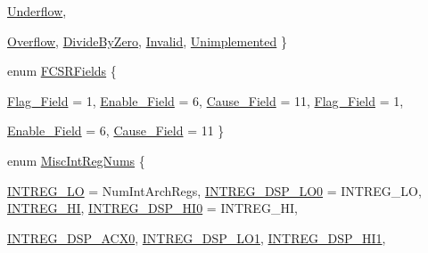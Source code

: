 \begin{DoxyCompactItemize}
\hyperlink{namespaceMipsISA_a79915055f9ee1b5f815a7998dbc159f7a32718a880dad0629f0eacfc00c357a80}{Underflow}, 
\par
\hyperlink{namespaceMipsISA_a79915055f9ee1b5f815a7998dbc159f7aee97c47c58ef6b199b0954a759735b60}{Overflow}, 
\hyperlink{namespaceMipsISA_a79915055f9ee1b5f815a7998dbc159f7ad2a1a3ed2bdff06d31747fdac31abf56}{DivideByZero}, 
\hyperlink{namespaceMipsISA_a79915055f9ee1b5f815a7998dbc159f7abf58891c7387fb7a63807ecf46aef000}{Invalid}, 
\hyperlink{namespaceMipsISA_a79915055f9ee1b5f815a7998dbc159f7ac64569bb9cffe0532bc43b52d7b6c383}{Unimplemented}
 \}
\item 
enum \hyperlink{namespaceMipsISA_a5f85a3bb291b65efdcd3ba3c88efb593}{FCSRFields} \{ \par
\hyperlink{namespaceMipsISA_a5f85a3bb291b65efdcd3ba3c88efb593a1aff867f90928d5da28980a3276bff58}{Flag\_\-Field} =  1, 
\hyperlink{namespaceMipsISA_a5f85a3bb291b65efdcd3ba3c88efb593a13b68e9f8c051df845dbc7f5d172ddb8}{Enable\_\-Field} =  6, 
\hyperlink{namespaceMipsISA_a5f85a3bb291b65efdcd3ba3c88efb593a5969dcc6eccf671e1f299ce5f4733d03}{Cause\_\-Field} =  11, 
\hyperlink{namespaceMipsISA_a5f85a3bb291b65efdcd3ba3c88efb593a1aff867f90928d5da28980a3276bff58}{Flag\_\-Field} =  1, 
\par
\hyperlink{namespaceMipsISA_a5f85a3bb291b65efdcd3ba3c88efb593a13b68e9f8c051df845dbc7f5d172ddb8}{Enable\_\-Field} =  6, 
\hyperlink{namespaceMipsISA_a5f85a3bb291b65efdcd3ba3c88efb593a5969dcc6eccf671e1f299ce5f4733d03}{Cause\_\-Field} =  11
 \}
\item 
enum \hyperlink{namespaceMipsISA_a9969c99e14b7b491ae9e3751404cc6a1}{MiscIntRegNums} \{ \par
\hyperlink{namespaceMipsISA_a9969c99e14b7b491ae9e3751404cc6a1a16fac3c219b82e1e7a2a6787ca2e8b85}{INTREG\_\-LO} =  NumIntArchRegs, 
\hyperlink{namespaceMipsISA_a9969c99e14b7b491ae9e3751404cc6a1a9a6440c5ae153540100888246bae0b41}{INTREG\_\-DSP\_\-LO0} =  INTREG\_\-LO, 
\hyperlink{namespaceMipsISA_a9969c99e14b7b491ae9e3751404cc6a1ab81dfa3bdd01e788f09f7a15a6efa175}{INTREG\_\-HI}, 
\hyperlink{namespaceMipsISA_a9969c99e14b7b491ae9e3751404cc6a1ac1c3dde172a813c59f953650384a4375}{INTREG\_\-DSP\_\-HI0} =  INTREG\_\-HI, 
\par
\hyperlink{namespaceMipsISA_a9969c99e14b7b491ae9e3751404cc6a1ad3637de2e59bf51c4004e2aef9dc89e0}{INTREG\_\-DSP\_\-ACX0}, 
\hyperlink{namespaceMipsISA_a9969c99e14b7b491ae9e3751404cc6a1a8e010a7055cd1e8e55776308966a684c}{INTREG\_\-DSP\_\-LO1}, 
\hyperlink{namespaceMipsISA_a9969c99e14b7b491ae9e3751404cc6a1a6bab93bce1ed54db562fec1e6351ea96}{INTREG\_\-DSP\_\-HI1}, 

\end{DoxyCompactItemize}
